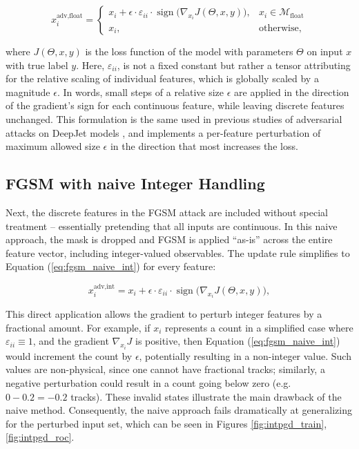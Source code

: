 \begin{equation}
x_i^{\text{adv,float}} = 
    \begin{cases}
        x_i + \epsilon \cdot \varepsilon_{ii} \cdot \operatorname{sign}\!\bigl(\nabla_{x_i} J(\Theta, x, y)\bigr), & x_i\in\mathcal{M}_{\text{float}} \\[6pt]
        x_i, & \text{otherwise},
    \end{cases}
\label{eq:fgsm}
\end{equation}

where $J(\Theta, x, y)$ is the loss function of the model with parameters $\Theta$ on input $x$ with true label $y$. 
Here, $\varepsilon_{ii}$, is not a fixed constant but rather a tensor attributing for the relative scaling of individual features, which is globally scaled by a magnitude $\epsilon$.  
In words, small steps of a relative size $\epsilon$ are applied in the direction of the gradient's sign for each continuous feature, while leaving discrete features unchanged. This formulation is the same used in previous studies of adversarial attacks on DeepJet models \cite{CMS-DP-2024-020}, and implements a per-feature perturbation of maximum allowed size $\epsilon$ in the direction that most increases the loss.

\subsection{FGSM with naive Integer Handling}

Next, the discrete features in the FGSM attack are included without special treatment – essentially pretending that all inputs are continuous. In this naive approach, the mask is dropped and FGSM is applied “as-is” across the entire feature vector, including integer-valued observables. The update rule simplifies to Equation (\ref{eq:fgsm_naive_int}) for every feature:

\begin{equation}
x_i^{\text{adv,int}} = x_i + \epsilon \cdot \varepsilon_{ii} \cdot \operatorname{sign}\!\bigl(\nabla_{x_i} J(\Theta, x, y)\bigr),
\label{eq:fgsm_naive_int}
\end{equation}

This direct application allows the gradient to perturb integer features by a fractional amount. For example, if $x_i$ represents a count in a simplified case where $\varepsilon_{ii}\equiv1$, and the gradient $\nabla_{x_i} J$ is positive, then Equation (\ref{eq:fgsm_naive_int}) would increment the count by $\epsilon$, potentially resulting in a non-integer value. Such values are non-physical, since one cannot have fractional tracks; similarly, a negative perturbation could result in a count going below zero (e.g. $0-0.2=-0.2$ tracks). These invalid states illustrate the main drawback of the naive method. Consequently, the naive approach fails dramatically at generalizing for the perturbed input set, which can be seen in Figures \ref{fig:intpgd_train}, \ref{fig:intpgd_roc}. 


